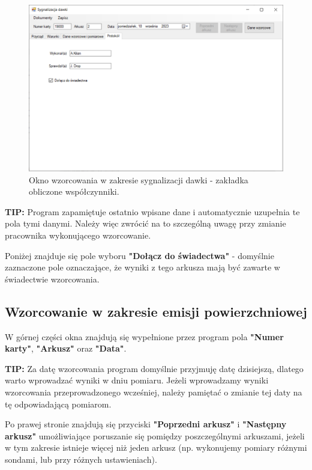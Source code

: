 	\begin{figure}[htb]
		\centering
		\includegraphics[width=\columnwidth]{obrazki/Wzorcowanie/syg_dawki/wspolczynniki.png}
		\caption{Okno wzorcowania w zakresie sygnalizacji dawki - zakładka obliczone współczynniki.}
		\label{sygDawkiWspolczynniki}
	\end{figure}
	
	\textbf{TIP:} Program zapamiętuje ostatnio wpisane dane i automatycznie uzupełnia te pola tymi danymi. Należy więc zwrócić na to szczególną uwagę przy zmianie pracownika wykonującego wzorcowanie.
	
	Poniżej znajduje się pole wyboru \textbf{"Dołącz do świadectwa"} - domyślnie zaznaczone pole oznaczające, że wyniki z tego arkusza mają być zawarte w świadectwie wzorcowania.

\subsection{Wzorcowanie w zakresie emisji powierzchniowej}
\label{wzorcowanie_emisja}

	W górnej części okna znajdują się wypełnione przez program pola \textbf{"Numer karty"}, \textbf{"Arkusz"} oraz \textbf{"Data"}. 
	
	\textbf{TIP:} Za datę wzorcowania program domyślnie przyjmuję datę dzisiejszą, dlatego warto wprowadzać wyniki w dniu pomiaru. Jeżeli wprowadzamy wyniki wzorcowania przeprowadzonego wcześniej, należy pamiętać o zmianie tej daty na tę odpowiadającą pomiarom.
	
	Po prawej stronie znajdują się przyciski \textbf{"Poprzedni arkusz"} i \textbf{"Następny arkusz"} umożliwiające poruszanie się pomiędzy poszczególnymi arkuszami, jeżeli w tym zakresie istnieje więcej niż jeden arkusz (np. wykonujemy pomiary różnymi sondami, lub przy różnych ustawieniach).
	

